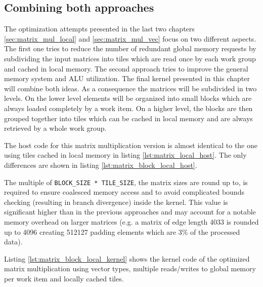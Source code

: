 \subsection{Combining both approaches}
The optimization attempts presented in the last two chapters \ref{sec:matrix_mul_local} and \ref{sec:matrix_mul_vec} focus on two different aspects. The first one tries to reduce the number of redundant global memory requests by subdividing the input matrices into tiles which are read once by each work group and cached in local memory. The second approach tries to improve the general memory system and ALU utilization. The final kernel presented in this chapter will combine both ideas.
As a consequence the matrices will be subdivided in two levels. On the lower level elements will be organized into small blocks which are always loaded completely by a work item. On a higher level, the blocks are then grouped together into tiles which can be cached in local memory and are always retrieved by a whole work group.

The host code for this matrix multiplication version is almost identical to the one using tiles cached in local memory in listing \ref{lst:matrix_local_host}. The only differences are shown in listing \ref{lst:matrix_block_local_host}.



The multiple of \lstinline!BLOCK_SIZE * TILE_SIZE!, the matrix sizes are round up to, is required to ensure coalesced memory access and to avoid complicated bounds checking (resulting in branch divergence) inside the kernel. This value is significant higher than in the previous approaches and may account for a notable memory overhead on larger matrices (e.g. a matrix of edge length 4033 is rounded up to 4096 creating 512127 padding elements which are 3\% of the processed data).

Listing \ref{lst:matrix_block_local_kernel} shows the kernel code of the optimized matrix multiplication using vector types, multiple reads/writes to global memory per work item and locally cached tiles.



